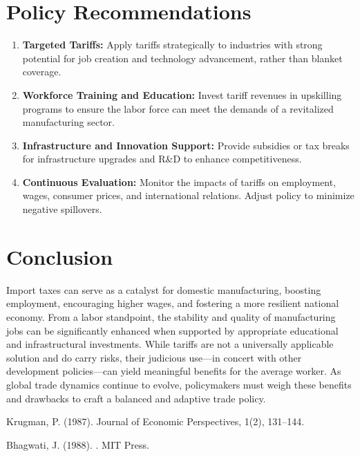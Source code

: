 \documentclass[12pt]{article}
\begin{document}
\section{Policy Recommendations}
\begin{enumerate}
    \item \textbf{Targeted Tariffs:} Apply tariffs strategically to industries with strong potential for job creation and technology advancement, rather than blanket coverage.
    \item \textbf{Workforce Training and Education:} Invest tariff revenues in upskilling programs to ensure the labor force can meet the demands of a revitalized manufacturing sector.
    \item \textbf{Infrastructure and Innovation Support:} Provide subsidies or tax breaks for infrastructure upgrades and R\&D to enhance competitiveness.
    \item \textbf{Continuous Evaluation:} Monitor the impacts of tariffs on employment, wages, consumer prices, and international relations. Adjust policy to minimize negative spillovers.
\end{enumerate}

\section{Conclusion}
Import taxes can serve as a catalyst for domestic manufacturing, boosting employment, encouraging higher wages, and fostering a more resilient national economy. From a labor standpoint, the stability and quality of manufacturing jobs can be significantly enhanced when supported by appropriate educational and infrastructural investments. While tariffs are not a universally applicable solution and do carry risks, their judicious use---in concert with other development policies---can yield meaningful benefits for the average worker. As global trade dynamics continue to evolve, policymakers must weigh these benefits and drawbacks to craft a balanced and adaptive trade policy.

\begin{thebibliography}{9}

Krugman, P. (1987).
\newblock Journal of Economic Perspectives, 1(2), 131--144.

Bhagwati, J. (1988).
.
\newblock MIT Press.

\end{thebibliography}
\end{document}
